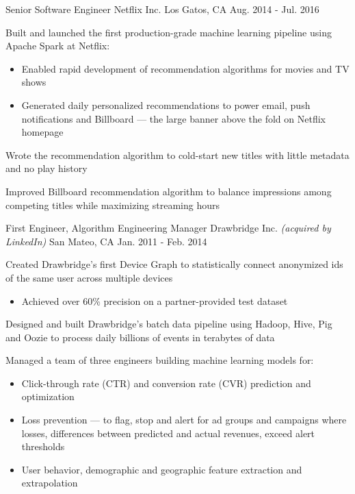 \begin{cventries}
  \cventry
  {Senior Software Engineer} %
  {Netflix Inc.} %
  {Los Gatos, CA} %
  {Aug. 2014 - Jul. 2016} %
  {
    \begin{cvitems} %
      \item{Built and launched the first production-grade machine learning pipeline using Apache Spark at Netflix:}
      \begin{itemize}[label=$\circ$]
        \item{Enabled rapid development of recommendation algorithms for movies and TV shows}
        \item{Generated daily personalized recommendations to power email, push notifications and Billboard --- the large banner above the fold on Netflix homepage}
      \end{itemize}
      \item{Wrote the recommendation algorithm to cold-start new titles with little metadata and no play history}
      \item{Improved Billboard recommendation algorithm to balance impressions among competing titles while maximizing streaming hours}
    \end{cvitems}
  }

  \cventry
  {First Engineer, Algorithm Engineering Manager} %
  {Drawbridge Inc. \bodyfontlight\emph{(acquired by LinkedIn)}} %
  {San Mateo, CA} %
  {Jan. 2011 - Feb. 2014} %
  {
    \begin{cvitems} %
      \item{Created Drawbridge's first Device Graph to statistically connect anonymized ids of the same user across multiple devices}
      \begin{itemize}[label=$\circ$]
        \item{Achieved over 60\% precision on a partner-provided test dataset}
      \end{itemize}
      \item{Designed and built Drawbridge’s batch data pipeline using Hadoop, Hive, Pig and Oozie to process daily billions of events in terabytes of data}
      \item{Managed a team of three engineers building machine learning models for:}
      \begin{itemize}[label=$\circ$]
        \item{Click-through rate (CTR) and conversion rate (CVR) prediction and optimization}
        \item{Loss prevention --- to flag, stop and alert for ad groups and campaigns where losses, differences between predicted and actual revenues, exceed alert thresholds}
        \item{User behavior, demographic and geographic feature extraction and extrapolation}
      \end{itemize}
    \end{cvitems}
  }


\end{cventries}
